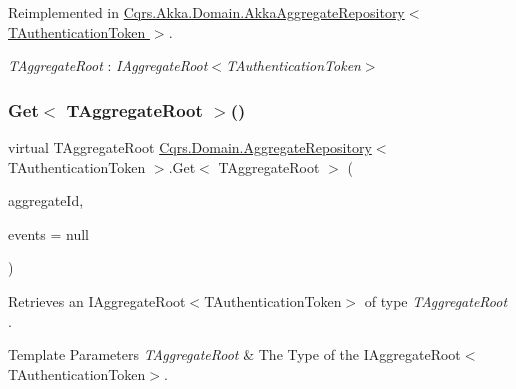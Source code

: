 Reimplemented in \hyperlink{classCqrs_1_1Akka_1_1Domain_1_1AkkaAggregateRepository_a889a80595755372614382c36092f30dc_a889a80595755372614382c36092f30dc}{Cqrs.\+Akka.\+Domain.\+Akka\+Aggregate\+Repository$<$ T\+Authentication\+Token $>$}.

\begin{Desc}
\item[Type Constraints]\begin{description}
\item[{\em T\+Aggregate\+Root} : {\em I\+Aggregate\+Root$<$T\+Authentication\+Token$>$}]\end{description}
\end{Desc}
\mbox{\label{classCqrs_1_1Domain_1_1AggregateRepository_a0e55881812d463129df34189d29544b6_a0e55881812d463129df34189d29544b6}} 
\subsubsection{\texorpdfstring{Get$<$ T\+Aggregate\+Root $>$()}{Get< TAggregateRoot >()}}
{\footnotesize\ttfamily virtual T\+Aggregate\+Root \hyperlink{classCqrs_1_1Domain_1_1AggregateRepository}{Cqrs.\+Domain.\+Aggregate\+Repository}$<$ T\+Authentication\+Token $>$.Get$<$ T\+Aggregate\+Root $>$ (\begin{DoxyParamCaption}\item[{Guid}]{aggregate\+Id,  }\item[{I\+List$<$ \hyperlink{interfaceCqrs_1_1Events_1_1IEvent}{I\+Event}$<$ T\+Authentication\+Token $>$$>$}]{events = {\ttfamily null} }\end{DoxyParamCaption})\hspace{0.3cm}{\ttfamily [virtual]}}



Retrieves an I\+Aggregate\+Root$<$\+T\+Authentication\+Token$>$ of type {\itshape T\+Aggregate\+Root} . 


\begin{DoxyTemplParams}{Template Parameters}
{\em T\+Aggregate\+Root} & The Type of the I\+Aggregate\+Root$<$\+T\+Authentication\+Token$>$.\\
\hline
\end{DoxyTemplParams}

